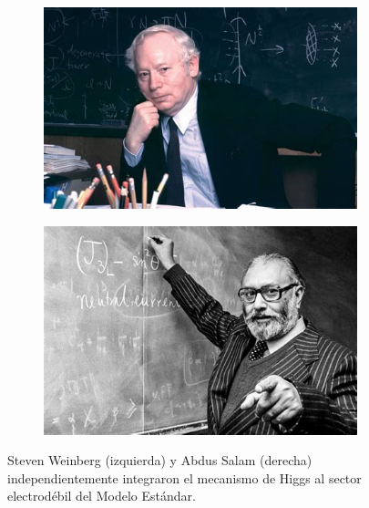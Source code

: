 \begin{figure}
\begin{subfigure}{0.5\textwidth}
	\includegraphics[scale=0.5]{images/weinberg.jpeg}
\end{subfigure}	
\begin{subfigure}{0.5\textwidth}
	\includegraphics[scale=0.5]{images/salam.jpeg}
\end{subfigure}	
\caption{Steven Weinberg (izquierda) y Abdus Salam (derecha)
independientemente integraron el mecanismo de Higgs al sector
electrod\'ebil del Modelo Est\'andar.}
\end{figure}

